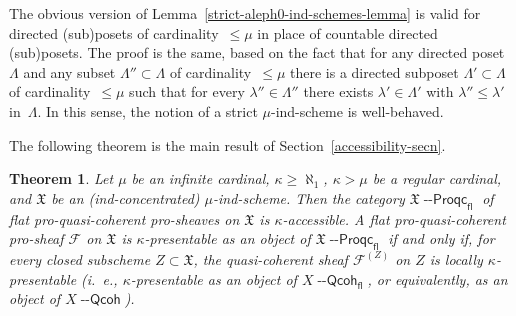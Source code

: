 \documentclass[12pt,a4paper]{amsart}
\newcommand{\+}{\protect\nobreakdash-}
\renewcommand{\:}{\colon}
\newcommand{\Qcoh}{{\operatorname{\mathsf{--Qcoh}}}}
\newcommand{\Proqc}{{\operatorname{\mathsf{--Proqc}}}}
\newcommand{\fl}{\mathsf{fl}}
\newcommand{\fX}{\mathfrak X}
\newcommand{\rF}{\mathscr F}
\theoremstyle{plain}
\newtheorem{thm}{Theorem}[section]
\theoremstyle{definition}
\begin{document}
 The obvious version of Lemma~\ref{strict-aleph0-ind-schemes-lemma}
is valid for directed (sub)posets of cardinality~$\le\mu$ in place
of countable directed (sub)posets.
 The proof is the same, based on the fact that for any directed
poset $\Lambda$ and any subset $\Lambda''\subset\Lambda$ of
cardinality~$\le\mu$ there is a directed subposet
$\Lambda'\subset\Lambda$ of cardinality~$\le\mu$ such that for
every $\lambda''\in\Lambda''$ there exists $\lambda'\in\Lambda'$ with
$\lambda''\le\lambda'$ in~$\Lambda$.
 In this sense, the notion of a strict $\mu$\+ind-scheme is
well-behaved.

 The following theorem is the main result of
Section~\ref{accessibility-secn}.

\begin{thm} \label{flat-proqcoh-prosheaves-accessible}
 Let\/ $\mu$ be an infinite cardinal, $\kappa\ge\aleph_1$, $\kappa>\mu$
be a regular cardinal, and\/ $\fX$ be an (ind-concentrated)
$\mu$\+ind-scheme.
 Then the category\/ $\fX\Proqc_\fl$ of flat pro-quasi-coherent
pro-sheaves on\/ $\fX$ is\/ $\kappa$\+accessible.
 A flat pro-quasi-coherent pro-sheaf\/ $\rF$ on\/ $\fX$ is
$\kappa$\+presentable as an object of\/ $\fX\Proqc_\fl$ if and only
if, for every closed subscheme $Z\subset\fX$, the quasi-coherent
sheaf\/ $\rF^{(Z)}$ on $Z$ is locally\/ $\kappa$\+presentable
(i.~e., $\kappa$\+presentable as an object of $X\Qcoh_\fl$, or
equivalently, as an object of $X\Qcoh$).
\end{thm}
\end{document}
